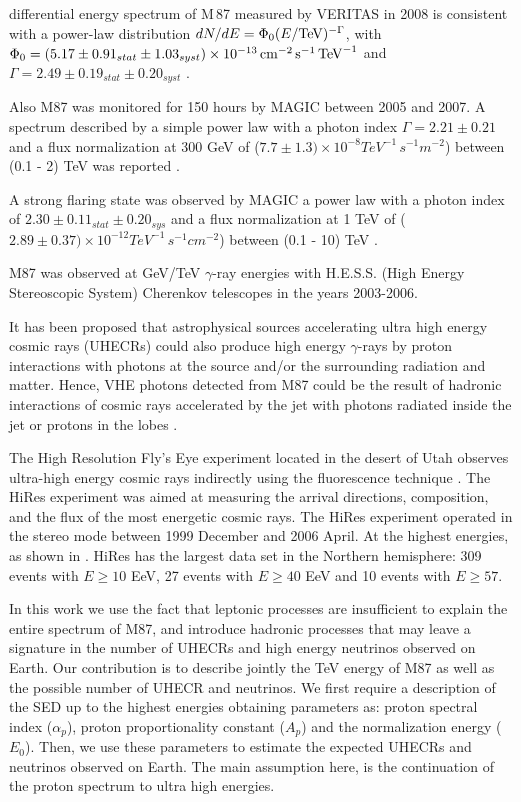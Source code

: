 \documentclass[preprint, twocolumn,secnumarabic,amssymb, nobibnotes, aps, prd]{revtex4-1}
\begin{document}
differential energy spectrum of M\,87 measured by VERITAS in 2008 is consistent with a power-law distribution $dN/dE = \Phi_0(E/\rm{TeV})^{-\Gamma}$, with $\Phi_0=(5.17 \pm 0.91_{stat} \pm 1.03_{syst}) \times 10^{-13} \rm{\,cm}^{-2} \rm{\,s}^{-1} \rm{\,TeV}^{-1}$ and $\Gamma=2.49 \pm 0.19_{stat} \pm 0.20_{syst}$ \cite{2010ApJ...716..819A}. 




Also M87 was monitored for 150 hours by MAGIC between 2005 and 2007. A spectrum described by a simple power law with a photon index $\Gamma=2.21\pm0.21$ and a flux normalization at 300 GeV of ($7.7\pm1.3)\times 10^{-8} TeV^{-1}\, s^{-1} m^{-2}$) between (0.1 - 2) TeV was reported \citep{2012A&A...544A..96A}.  

A strong flaring state was observed by MAGIC a power law with a photon index of $2.30\pm 0.11_{stat}\pm0.20_{sys}$    and a flux normalization at 1 TeV of  ($2.89\pm0.37)\times 10^{-12} TeV^{-1}\, s^{-1} cm^{-2}$) between (0.1 - 10) TeV \citep{2008ApJ...685L..23A}.


M87 was observed at GeV/TeV $\gamma$-ray energies with H.E.S.S. (High Energy Stereoscopic System) Cherenkov telescopes in the years 2003-2006.


It has been proposed that astrophysical sources accelerating ultra high energy cosmic rays (UHECRs)  could also produce high energy $\gamma$-rays by proton interactions with photons at the source and/or the surrounding radiation and matter.  Hence, VHE photons detected from M87 could be the result of hadronic interactions of cosmic rays accelerated by the jet with photons radiated inside the jet  or protons in the lobes \citep{gop10, rie09, kac09a, kac09b, rom96, iso02, hon09, abd10, der09}.

The High Resolution Fly's Eye experiment located in the desert of Utah observes ultra-high energy cosmic rays indirectly using the fluorescence technique \citep{abb07,abb10}.  The HiRes experiment was aimed at  measuring the arrival directions, composition, and the flux  of the most energetic cosmic rays.
The HiRes experiment  operated in the stereo mode between 1999 December and 2006 April.  At the highest energies, as shown  in  \citep{abb10}. HiRes has the largest data set in the Northern hemisphere: 309 events with $E\geq10$ EeV, 27 events with  $E\geq40$ EeV and 10 events with $E\geq57$.


 In this work we use the fact  that leptonic processes are insufficient to explain the entire spectrum of M87, and introduce hadronic processes that may leave a signature in the number of UHECRs and high energy neutrinos observed on Earth.  Our contribution is to describe jointly the TeV energy of M87 as well as the possible  number of UHECR and neutrinos. We first require a description of the SED up to the highest energies obtaining parameters as:  proton spectral index ($\alpha_p$),  proton proportionality constant ($A_p$) and  the normalization energy ($E_0$). Then, we use these parameters to estimate the expected UHECRs and neutrinos observed on Earth. The main assumption here, is the continuation of the proton spectrum to ultra high energies. 
\end{document}
